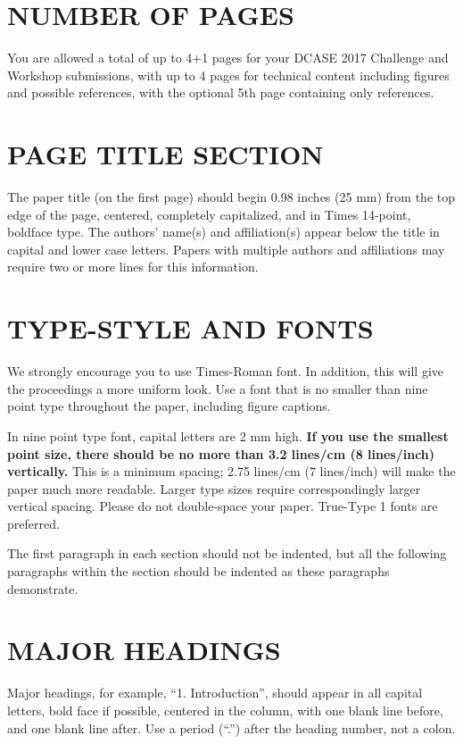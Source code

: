 \documentclass{article}
\begin{document}
\begin{sloppy}
\section{NUMBER OF PAGES}
\label{sec:pagelimit}

You are allowed a total of up to 4+1 pages for your DCASE 2017 Challenge and Workshop submissions, with up to 4 pages for technical content including figures and possible references, with the optional 5th page containing only references. 

\section{PAGE TITLE SECTION}
\label{sec:pagestyle}

The paper title (on the first page) should begin 0.98 inches (25 mm) from the top edge of the page, centered, completely capitalized, and in Times 14-point, boldface type. The authors' name(s) and affiliation(s) appear below the title in capital and lower case letters.  Papers with multiple authors and affiliations may require two or more lines for this information.

\section{TYPE-STYLE AND FONTS}
\label{sec:typestyle}

We strongly encourage you to use Times-Roman font. In addition, this will give the proceedings a more uniform look. Use a font that is no smaller than nine point type throughout the paper, including figure captions.

In nine point type font, capital letters are 2 mm high. {\bf If you use the smallest point size, there should be no more than 3.2 lines/cm (8 lines/inch) vertically.} This is a minimum spacing; 2.75 lines/cm (7 lines/inch) will make the paper much more readable. Larger type sizes require correspondingly larger vertical spacing. Please do not double-space your paper. True-Type 1 fonts are preferred.

The first paragraph in each section should not be indented, but all the following paragraphs within the section should be indented as these paragraphs demonstrate.

\section{MAJOR HEADINGS}
\label{sec:majhead}

Major headings, for example, ``1. Introduction'', should appear in all capital letters, bold face if possible, centered in the column, with one blank line before, and one blank line after. Use a period (``.'') after the heading number, not a colon.


\end{sloppy}
\end{document}
